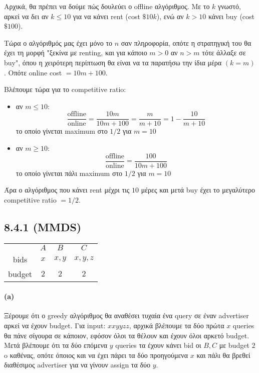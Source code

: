\documentclass[a4paper,11pt]{article}
\begin{document}
Αρχικά, θα πρέπει να δούμε πώς δουλεύει ο offline αλγόριθμος.
Με το $k$ γνωστό, αρκεί να δει αν $k \leq 10$ για να κάνει rent (cost $\$10k$), ενώ αν $k > 10$ κάνει buy (cost $\$100$).

Τώρα ο αλγόριθμός μας έχει μόνο το $n$ σαν πληροφορία, οπότε η στρατηγική του θα έχει τη μορφή "ξεκίνα με renting, και για κάποιο $m>0$ αν $n>m$ τότε άλλαξε σε buy", όπου η χειρότερη περίπτωση θα είναι να τα παρατήσω την ίδια μέρα $(k=m)$.
Οπότε online cost $=10m+100$.

Βλέπουμε τώρα για το competitive ratio:
\begin{itemize}
	\item αν $m \leq 10$:
		\[
			\frac{\text{offline}}{\text{online}} = \frac{10m}{10m+100} = \frac{m}{m+10} = 1 - \frac{10}{m+10}
		\]
		το οποίο γίνεται maximum στο $1/2$ για $m=10$
	\item αν $m \geq 10$:
		\[
			\frac{\text{offline}}{\text{online}} = \frac{100}{10m+100}
		\]
		το οποίο γίνεται πάλι maximum στο $1/2$ για $m=10$
\end{itemize}
Άρα ο αλγόριθμος που κάνει rent μέχρι τις $10$ μέρες και μετά buy έχει το μεγαλύτερο competitive ratio $=1/2$.

\subsection*{8.4.1 (MMDS)}

\begin{center}
	\begin{tabular}{| c || c | c | c |}
		\hline
		& $A$ & $B$ & $C$ \\ \hhline{|=#=|=|=|}
		bids & $x$ & $x,y$ & $x,y,z$ \\ \hline
		budget & $2$ & $2$ & $2$ \\ \hline
	\end{tabular}
\end{center}

\paragraph{(a)} Ξέρουμε ότι ο greedy αλγόριθμος θα αναθέσει τυχαία ένα query σε έναν advertiser αρκεί να έχουν budget.
Για input: $xxyyzz$, αρχικά βλέπουμε τα δύο πρώτα $x$ queries θα πάνε σίγουρα σε κάποιον, εφόσον όλοι τα θέλουν και έχουν όλοι αρκετό budget.
Μετά βλέπουμε ότι τα δύο επόμενα $y$ queries τα έχουν κάνει bid οι $B,C$ με budget $2$ o καθένας, οπότε όποιος και να έχει πάρει τα δύο προηγούμενα $x$ και πάλι θα βρεθεί διαθέσιμος advertiser για να γίνουν assign τα δύο $y$.
\end{document}
